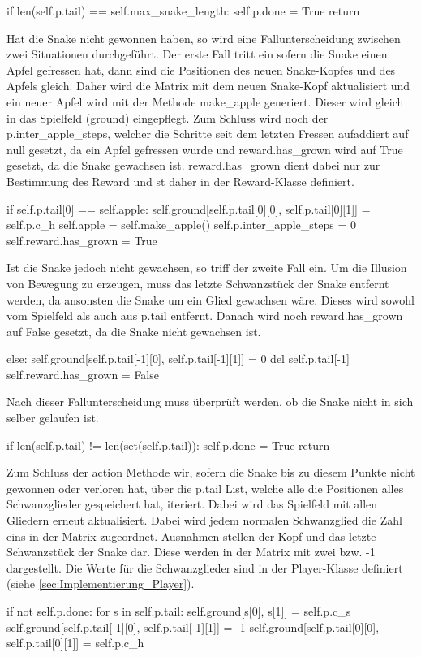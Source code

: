 \begin{python}
	 if len(self.p.tail) == self.max_snake_length:
		self.p.done = True
		return
\end{python}
Hat die Snake nicht gewonnen haben, so wird eine Fallunterscheidung zwischen zwei Situationen durchgeführt. Der erste Fall tritt ein sofern die Snake einen Apfel gefressen hat, dann sind die Positionen des neuen Snake-Kopfes und des Apfels gleich. Daher wird die Matrix mit dem neuen Snake-Kopf aktualisiert und ein neuer Apfel wird mit der Methode make\_apple generiert. Dieser wird gleich in das Spielfeld (ground) eingepflegt. Zum Schluss wird noch der p.inter\_apple\_steps, welcher die Schritte seit dem letzten Fressen aufaddiert auf null gesetzt, da ein Apfel gefressen wurde und reward.has\_grown wird auf True gesetzt, da die Snake gewachsen ist. reward.has\_grown dient dabei nur zur Bestimmung des Reward und st daher in der Reward-Klasse definiert.
\begin{python}
	if self.p.tail[0] == self.apple:
		self.ground[self.p.tail[0][0], self.p.tail[0][1]] = self.p.c_h
		self.apple = self.make_apple()
		self.p.inter_apple_steps = 0
		self.reward.has_grown = True
\end{python}
Ist die Snake jedoch nicht gewachsen, so triff der zweite Fall ein. Um die Illusion von Bewegung zu erzeugen, muss das letzte Schwanzstück der Snake entfernt werden, da ansonsten die Snake um ein Glied gewachsen wäre. Dieses wird sowohl vom Spielfeld als auch aus p.tail entfernt. Danach wird noch reward.has\_grown auf False gesetzt, da die Snake nicht gewachsen ist.
\begin{python}
	else:
		self.ground[self.p.tail[-1][0], self.p.tail[-1][1]] = 0
		del self.p.tail[-1]
		self.reward.has_grown = False
\end{python}
Nach dieser Fallunterscheidung muss überprüft werden, ob die Snake nicht in sich selber gelaufen ist.
\begin{python}
	if len(self.p.tail) != len(set(self.p.tail)):
		self.p.done = True
		return
\end{python}
Zum Schluss der action Methode wir, sofern die Snake bis zu diesem Punkte nicht gewonnen oder verloren hat, über die p.tail List, welche alle die Positionen alles Schwanzglieder gespeichert hat, iteriert. Dabei wird das Spielfeld mit allen Gliedern erneut aktualisiert. Dabei wird jedem normalen Schwanzglied die Zahl eins in der Matrix zugeordnet. Ausnahmen stellen der Kopf und das letzte Schwanzstück der Snake dar. Diese werden in der Matrix mit zwei bzw. -1 dargestellt. Die Werte für die Schwanzglieder sind in der Player-Klasse definiert (siehe \ref{sec:Implementierung_Player}).
\begin{python}
	if not self.p.done:
		for s in self.p.tail:
			self.ground[s[0], s[1]] = self.p.c_s
		self.ground[self.p.tail[-1][0], self.p.tail[-1][1]] = -1
		self.ground[self.p.tail[0][0], self.p.tail[0][1]] = self.p.c_h
\end{python}

